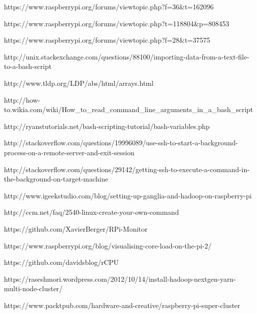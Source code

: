 \documentclass[]{article}
\begin{document}
https://www.raspberrypi.org/forums/viewtopic.php?f=36\&t=162096

https://www.raspberrypi.org/forums/viewtopic.php?t=118804\&p=808453

https://www.raspberrypi.org/forums/viewtopic.php?f=28\&t=37575

http://unix.stackexchange.com/questions/88100/importing-data-from-a-text-file-to-a-bash-script

http://www.tldp.org/LDP/abs/html/arrays.html

http://how-to.wikia.com/wiki/How\_to\_read\_command\_line\_arguments\_in\_a\_bash\_script

http://ryanstutorials.net/bash-scripting-tutorial/bash-variables.php

http://stackoverflow.com/questions/19996089/use-ssh-to-start-a-background-process-on-a-remote-server-and-exit-session

http://stackoverflow.com/questions/29142/getting-ssh-to-execute-a-command-in-the-background-on-target-machine

http://www.igeekstudio.com/blog/setting-up-ganglia-and-hadoop-on-raspberry-pi

http://ccm.net/faq/2540-linux-create-your-own-command

https://github.com/XavierBerger/RPi-Monitor

https://www.raspberrypi.org/blog/visualising-core-load-on-the-pi-2/

https://github.com/davidsblog/rCPU

https://raseshmori.wordpress.com/2012/10/14/install-hadoop-nextgen-yarn-multi-node-cluster/

https://www.packtpub.com/hardware-and-creative/raspberry-pi-super-cluster
\end{document}
